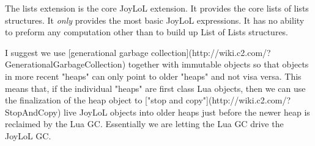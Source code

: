 
\startJoyLoLCoAlg[title=Lists of Lists][lists]

\srcCopyrightCCBYSA[title={JoyLoL}, url=https://perceptisys.co.uk, 
src=https://github.com/stephengaito/joylol, author={Perceptisys Ltd 
(Stephen Gaito)}, year=2017] 

\targetCopyrightMIT[author={PerceptiSys Ltd (Stephen Gaito)}, year=2017]

\startsection[title=Goals]

The lists extension is the core JoyLoL extension. It provides the core 
lists of lists structures. It \emph{only} provides the most basic JoyLoL 
expressions. It has no ability to preform any computation other than to 
build up List of Lists structures. 

I suggest we use [generational garbage 
collection](http://wiki.c2.com/?GenerationalGarbageCollection) together 
with immutable objects so that objects in more recent "heaps" can only 
point to older "heaps" and not visa versa. This means that, if the 
individual "heaps" are first class Lua objects, then we can use the 
finalization of the heap object to ["stop and 
copy"](http://wiki.c2.com/?StopAndCopy) live JoyLoL objects into older 
heaps just before the newer heap is reclaimed by the Lua GC. Essentially 
we are letting the Lua GC drive the JoyLoL GC. 





\stopJoyLoLCoAlg
